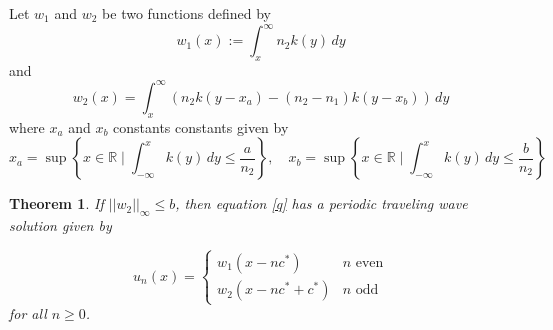 \documentclass[11pt]{article}
\newtheorem{thm}{Theorem}
\newtheorem{prop}[thm]{Proposition}
\theoremstyle{definition}
\numberwithin{equation}{section}
\numberwithin{thm}{section}
\renewcommand{\a}{a}
\renewcommand{\b}{b}
\newcommand{\m}{n_1}
\newcommand{\mtwo}{n_2}
\begin{document}
%

 Let $w_1$ and $w_2$ be two functions defined by
\begin{equation} \label{w1}
w_1(x) := \int_x^\infty \mtwo k(y) \, dy
\end{equation}
and
\begin{equation} \label{w2}
w_2(x) = \int_x^\infty \left( \mtwo k(y-x_\a) - (\mtwo-\m)k(y-x_\b)\right) \, dy 
\end{equation} 
where $x_\a$ and $x_\b$ constants constants given by
\begin{equation}
x_\a =\sup\left\{x\in\mathbb R\mid \int_{-\infty}^{x} k(y) \, dy \leq \frac{\a}{\mtwo} \right\}, \quad
x_\b =\sup\left\{x\in\mathbb R\mid \int_{-\infty}^{x} k(y) \, dy \leq \frac{\b}{\mtwo} \right\}
\end{equation}


\begin{thm} \label{theorem1}
If $|| w_2 ||_\infty\leq \b$, then equation \eqref{q} has a periodic traveling wave solution given by %

\begin{equation} \label{ptw}
u_n(x) = \begin{cases}
w_1(x-nc^*) & n \text{ even} \\
w_2(x-nc^*+c^*) & n \text{ odd}
\end{cases}
\end{equation}
for all $n \geq 0$.
\end{thm}
\end{document}
